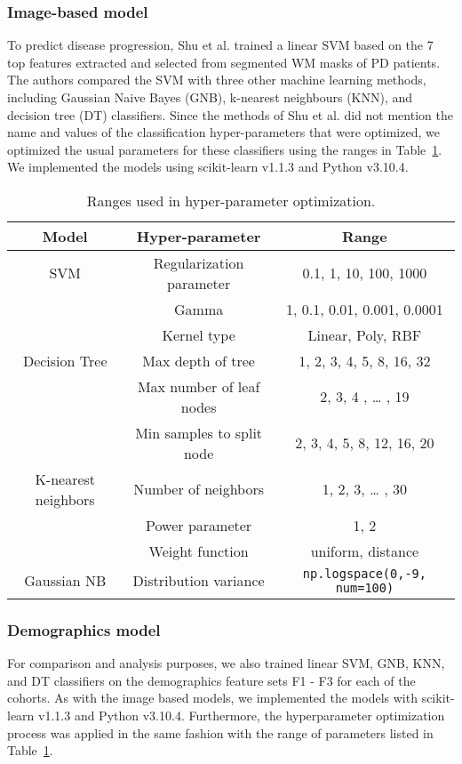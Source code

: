 \subsubsection*{Image-based model}
To predict disease progression, Shu et al. trained a linear SVM based on the 7 top features extracted and selected from 
segmented WM masks of PD patients. The authors compared the SVM with three other machine learning methods, including 
Gaussian Naive Bayes (GNB), k-nearest neighbours (KNN), and decision tree (DT) classifiers. Since the methods of Shu et al. 
did not mention the name and values of the classification hyper-parameters that were optimized, we optimized the usual 
parameters for these classifiers using the ranges in Table~\ref{table:hyperParamTable}. We implemented the models using 
scikit-learn v1.1.3 and Python v3.10.4.

\begin{table}[h]
\centering
\begin{tabular}{|c|c|c|}
    \hline
    \textbf{Model} & \textbf{Hyper-parameter} & \textbf{Range} \\
    \hline
    SVM & 
    Regularization parameter & 0.1, 1, 10, 100, 1000 \\
    & Gamma & 1, 0.1, 0.01, 0.001, 0.0001 \\
    & Kernel type & Linear, Poly, RBF \\
    \hline
    Decision Tree & 
    Max depth of tree & 1, 2, 3, 4, 5, 8, 16, 32 \\
    & Max number of leaf nodes & 2, 3, 4 , … , 19 \\
    & Min samples to split node & 2, 3, 4, 5, 8, 12, 16, 20 \\
    \hline
    K-nearest neighbors & 
    Number of neighbors & 1, 2, 3, … , 30 \\
    & Power parameter & 1, 2 \\
    & Weight function & uniform, distance \\
    \hline
    Gaussian NB & 
    Distribution variance & \verb|np.logspace(0,-9, num=100)| \\
    \hline
\end{tabular}
\caption{Ranges used in hyper-parameter optimization.}
\label{table:hyperParamTable}
\end{table}

\subsubsection*{Demographics model}

For comparison and analysis purposes, we also trained linear SVM, GNB, KNN, and DT classifiers on the demographics 
feature sets F1 - F3 for each of the cohorts. As with the image based models, we implemented the models with 
scikit-learn v1.1.3 and Python v3.10.4. Furthermore, the hyperparameter optimization process was applied in the same fashion  
with the range of parameters listed in Table~\ref{table:hyperParamTable}.